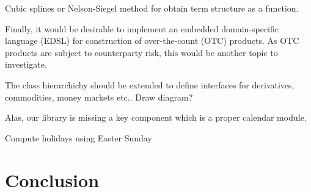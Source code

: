 Cubic splines or Nelson-Siegel method for obtain term structure as a function.

Finally, it would be desirable to implement an embedded domain-specific language (EDSL) for construction of over-the-count (OTC) products.
As OTC products are subject to counterparty risk, this would be another topic to investigate.

The class hierarchichy should be extended to define interfaces for derivatives, commodities, money markets etc.. Draw diagram?

Alas, our library is missing a key component which is a proper calendar module.

Compute holidays using Easter Sunday

\chapter{Conclusion}
